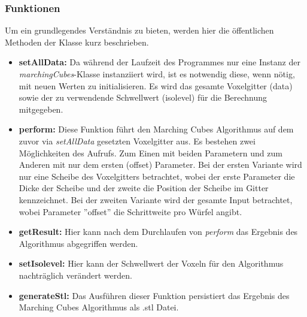 \subsubsection{Funktionen}
Um ein grundlegendes Verständnis zu bieten, werden hier die öffentlichen Methoden der Klasse kurz beschrieben. \\
\begin{itemize}
	\item \textbf{setAllData:} Da während der Laufzeit des Programmes nur eine Instanz der \textit{marchingCubes}-Klasse instanziiert wird, ist es notwendig diese, wenn nötig, mit neuen Werten zu initialisieren. Es wird das gesamte Voxelgitter (data) sowie der zu verwendende Schwellwert (isolevel) für die Berechnung mitgegeben.
	\item \textbf{perform:} Diese Funktion führt den Marching Cubes Algorithmus auf dem zuvor via \textit{setAllData} gesetzten Voxelgitter aus. Es bestehen zwei Möglichkeiten des Aufrufs. Zum Einen mit beiden Parametern und zum Anderen mit nur dem ersten (offset) Parameter. Bei der ersten Variante wird nur eine Scheibe des Voxelgitters betrachtet, wobei der erste Parameter die Dicke der Scheibe und der zweite die Position der Scheibe im Gitter kennzeichnet. Bei der zweiten Variante wird der gesamte Input betrachtet, wobei Parameter ''offset'' die Schrittweite pro Würfel angibt. 
	\item \textbf{getResult:} Hier kann nach dem Durchlaufen von \textit{perform} das Ergebnis des Algorithmus abgegriffen werden. 
	\item \textbf{setIsolevel:} Hier kann der Schwellwert der Voxeln für den Algorithmus nachträglich verändert werden.
	\item \textbf{generateStl:} Das Ausführen dieser Funktion persistiert das Ergebnis des Marching Cubes Algorithmus als .stl Datei.
\end{itemize}
